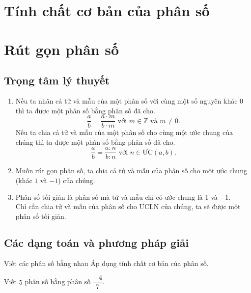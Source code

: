 \section{Tính chất cơ bản của phân số}
\section{Rút gọn phân số}
\subsection{Trọng tâm lý thuyết}
\begin{enumerate}
	\item Nếu ta nhân cả tử và mẫu của một phân số với cùng một số nguyên khác $0$ thì ta được một phân số bằng phân số đã cho.
	\[ \dfrac{a}{b}=\dfrac{a\cdot m}{b\cdot m} \text{ với } m \in \mathbb{Z} \text{ và } m \neq 0. \]
	Nếu ta chia cả tử và mẫu của một phân số cho cùng một ước chung của chúng thì ta được một phân số bằng phân số đã cho.
	\[ \dfrac{a}{b}=\dfrac{a:n}{b:n} \text{ với } n\in \text{ƯC}(a,b). \]
	\item Muốn rút gọn phân số, ta chia cả tử và mẫu của phân số cho một ước chung (khác $1$ và $-1$) của chúng.
	\item Phân số tối giản là phân số mà tử và mẫu chỉ có ước chung là $1$ và $-1$.\\
	Chỉ cần chia tử và mẫu của phân số cho ƯCLN của chúng, ta sẽ được một phân số tối giản.
\end{enumerate}

\subsection{Các dạng toán và phương pháp giải}

\begin{dang}{Viết các phân số bằng nhau}
Áp dụng tính chất cơ bản của phân số.
\end{dang}

\begin{vd}%
Viết $5$ phân số bằng phân số $\dfrac{-4}{7}$.
\end{vd}

